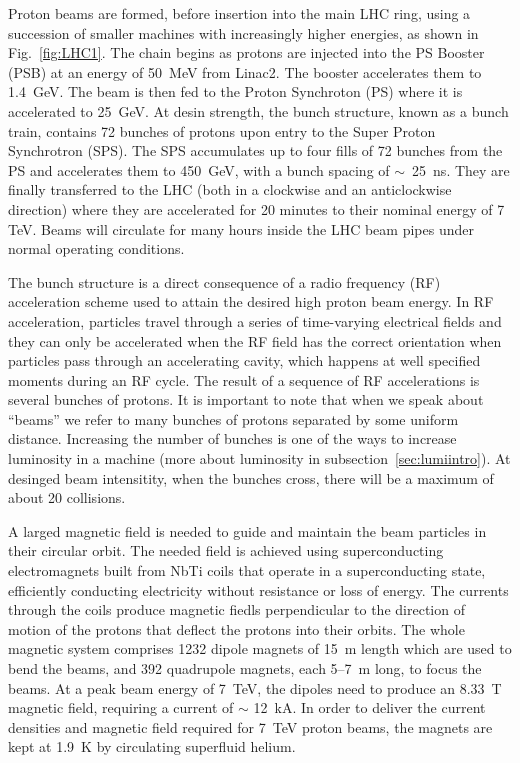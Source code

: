 Proton beams are formed, before insertion into the main LHC ring, using a succession of smaller machines with increasingly  higher energies, as shown in Fig.~\ref{fig:LHC1}. The chain begins as protons are injected into the PS Booster (PSB) at an energy of 50~MeV from Linac2. The booster accelerates them to 1.4~GeV. The beam is then fed to the Proton Synchroton (PS) where it is accelerated to 25~GeV. At desin strength, the bunch structure, known as a bunch train, contains 72 bunches of protons upon entry to the Super Proton Synchrotron (SPS). The SPS accumulates up to four fills of 72 bunches from the PS and accelerates them to 450~GeV, with a bunch spacing of $\sim$~25~ns. They are finally transferred to the LHC (both in a clockwise and an anticlockwise direction) where they are accelerated for 20 minutes to their nominal energy of 7 TeV. Beams will circulate for many hours inside the LHC beam pipes under normal operating conditions.

The bunch structure is a direct consequence of a radio frequency (RF) acceleration scheme used to attain the desired high proton beam energy.  In RF acceleration, particles travel through a series of time-varying electrical fields and they can only be accelerated when the RF field has the correct orientation when particles pass through an accelerating cavity, which happens at well specified moments during an RF cycle. The result of a sequence of RF accelerations is several bunches of protons. It is important to note that when we speak about ``beams'' we refer to many bunches of protons separated by some uniform distance. Increasing the number of bunches is one of the ways to increase luminosity in a machine (more about luminosity in subsection~\ref{sec:lumiintro}). At desinged beam intensitity, when the bunches cross, there will be a maximum of about 20 collisions.

A larged magnetic field is needed to guide and maintain the beam particles in their circular orbit. The needed field is achieved using superconducting electromagnets built from NbTi coils that operate in a superconducting state, efficiently conducting electricity without resistance or loss of energy. The currents through the coils produce magnetic fiedls perpendicular to the direction of motion of the protons that deflect the protons into their orbits.  The whole magnetic system comprises 1232 dipole magnets of 15~m length which are used to bend the beams, and 392 quadrupole magnets, each 5–7~m long, to focus the beams. At a peak beam energy of 7~TeV, the dipoles need to produce an 8.33~T magnetic field, requiring a current of $\sim$ 12~kA. In order to deliver the current densities and magnetic field required for 7~TeV proton beams, the magnets are kept at 1.9~K by circulating superfluid helium.

